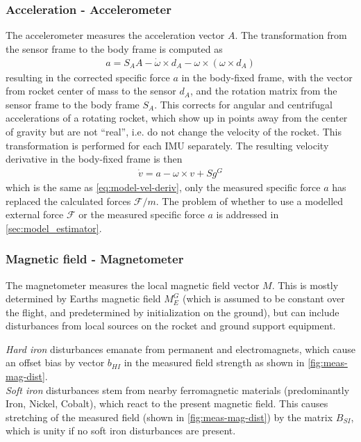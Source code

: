 \subsubsection{Acceleration - Accelerometer}
The accelerometer measures the acceleration vector $A$.
The transformation from the sensor frame to the body frame is computed as \cite{stevens2015}
\begin{align}
    a = S_A A - \dot \omega \times d_A - \omega \times (\omega \times d_A)
    \label{eq:meas-accel}
\end{align}
resulting in the corrected specific force $a$ in the body-fixed frame, with the vector from rocket center of mass to the sensor $d_A$, and the rotation matrix from the sensor frame to the body frame $S_A$.
This corrects for angular and centrifugal accelerations of a rotating rocket, which show up in points away from the center of gravity but are not ``real'', i.e. do not change the velocity of the rocket. 
This transformation is performed for each IMU separately.
The resulting velocity derivative in the body-fixed frame is then \cite{zipfel2007, stevens2015}
\begin{align}
    \dot v = a - \omega \times v + S g^G
    \label{eq:meas-veldot}
\end{align}
which is the same as \autoref{eq:model-vel-deriv}, only the measured specific force $a$ has replaced the calculated forces $\mathcal{F}/m$.
The problem of whether to use a modelled external force $\mathcal{F}$ or the measured specific force $a$ is addressed in \autoref{sec:model_estimator}.

\subsubsection{Magnetic field - Magnetometer}
The magnetometer measures the local magnetic field vector $M$.
This is mostly determined by Earths magnetic field $M_E^G$ (which is assumed to be constant over the flight, and predetermined by initialization on the ground), but can include disturbances from local sources on the rocket and ground support equipment.

\textit{Hard iron} disturbances emanate from permanent and electromagnets, which cause an offset bias by vector $b_{HI}$ in the measured field strength as shown in \autoref{fig:meas-mag-dist}. \\
\textit{Soft iron} disturbances stem from nearby ferromagnetic materials (predominantly Iron, Nickel, Cobalt), which react to the present magnetic field. 
This causes stretching of the measured field (shown in \autoref{fig:meas-mag-dist}) by the matrix $B_{SI}$, which is unity if no soft iron disturbances are present.

